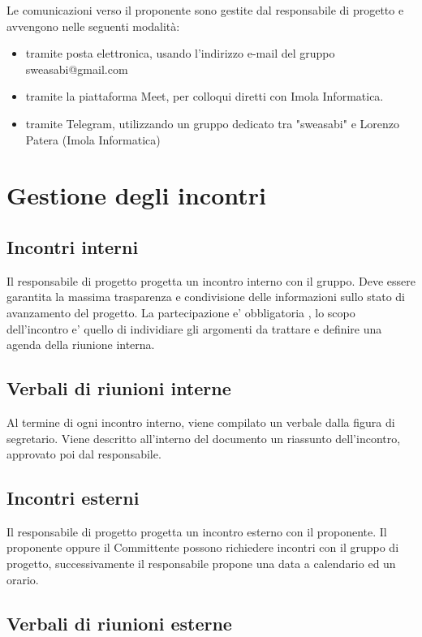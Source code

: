 Le comunicazioni verso il proponente sono gestite dal responsabile di progetto e avvengono nelle seguenti modalità:

\begin{itemize}
\item tramite posta elettronica, usando l'indirizzo e-mail del gruppo sweasabi@gmail.com
\item tramite la piattaforma Meet, per colloqui diretti con Imola Informatica.
\item tramite Telegram, utilizzando un gruppo dedicato tra "sweasabi" e Lorenzo Patera (Imola Informatica)
\end{itemize}

\section{Gestione degli incontri}

\subsection{Incontri interni}

Il responsabile di progetto progetta un incontro interno con il gruppo. Deve essere garantita la massima trasparenza e condivisione delle informazioni sullo stato di avanzamento del progetto.
La partecipazione e' obbligatoria , lo scopo dell'incontro e' quello di individiare gli argomenti da trattare e definire una agenda della riunione interna.

\subsection{Verbali di riunioni interne}

Al termine di ogni incontro interno, viene compilato un verbale dalla figura di segretario. Viene descritto all'interno del documento un riassunto dell'incontro, approvato poi dal responsabile.

\subsection{Incontri esterni}

Il responsabile di progetto progetta un incontro esterno con il proponente. Il proponente oppure il Committente possono richiedere incontri con il gruppo di progetto, successivamente il responsabile propone una data a calendario ed un orario.

\subsection{Verbali di riunioni esterne}

